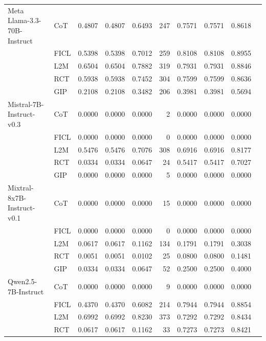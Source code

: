 \documentclass[conference]{IEEEtran}
\begin{document}
\begin{longtable}{p{3.5cm} l r r r r r r r r}
Meta Llama-3.3-70B-Instruct & CoT  & 0.4807 & 0.4807 & 0.6493 & 247 & 0.7571 & 0.7571 & 0.8618 \\
                            & FICL & 0.5398 & 0.5398 & 0.7012 & 259 & 0.8108 & 0.8108 & 0.8955 \\
                            & L2M  & 0.6504 & 0.6504 & 0.7882 & 319 & 0.7931 & 0.7931 & 0.8846 \\
                            & RCT  & 0.5938 & 0.5938 & 0.7452 & 304 & 0.7599 & 0.7599 & 0.8636 \\
                            & GIP  & 0.2108 & 0.2108 & 0.3482 & 206 & 0.3981 & 0.3981 & 0.5694 \\
Mistral-7B-Instruct-v0.3    & CoT  & 0.0000 & 0.0000 & 0.0000 & 2  & 0.0000 & 0.0000 & 0.0000 \\
                            & FICL & 0.0000 & 0.0000 & 0.0000 & 0  & 0.0000 & 0.0000 & 0.0000 \\
                            & L2M  & 0.5476 & 0.5476 & 0.7076 & 308 & 0.6916 & 0.6916 & 0.8177 \\
                            & RCT  & 0.0334 & 0.0334 & 0.0647 & 24  & 0.5417 & 0.5417 & 0.7027 \\
                            & GIP  & 0.0000 & 0.0000 & 0.0000 & 5  & 0.0000 & 0.0000 & 0.0000 \\
Mixtral-8x7B-Instruct-v0.1  & CoT  & 0.0000 & 0.0000 & 0.0000 & 15 & 0.0000 & 0.0000 & 0.0000 \\
                            & FICL & 0.0000 & 0.0000 & 0.0000 & 0  & 0.0000 & 0.0000 & 0.0000 \\
                            & L2M  & 0.0617 & 0.0617 & 0.1162 & 134 & 0.1791 & 0.1791 & 0.3038 \\
                            & RCT  & 0.0051 & 0.0051 & 0.0102 & 25  & 0.0800 & 0.0800 & 0.1481 \\
                            & GIP  & 0.0334 & 0.0334 & 0.0647 & 52  & 0.2500 & 0.2500 & 0.4000 \\
Qwen2.5-7B-Instruct         & CoT  & 0.0000 & 0.0000 & 0.0000 & 9  & 0.0000 & 0.0000 & 0.0000 \\
                            & FICL & 0.4370 & 0.4370 & 0.6082 & 214 & 0.7944 & 0.7944 & 0.8854 \\
                            & L2M  & 0.6992 & 0.6992 & 0.8230 & 373 & 0.7292 & 0.7292 & 0.8434 \\
                            & RCT  & 0.0617 & 0.0617 & 0.1162 & 33  & 0.7273 & 0.7273 & 0.8421 \\

\end{longtable}
\end{document}
